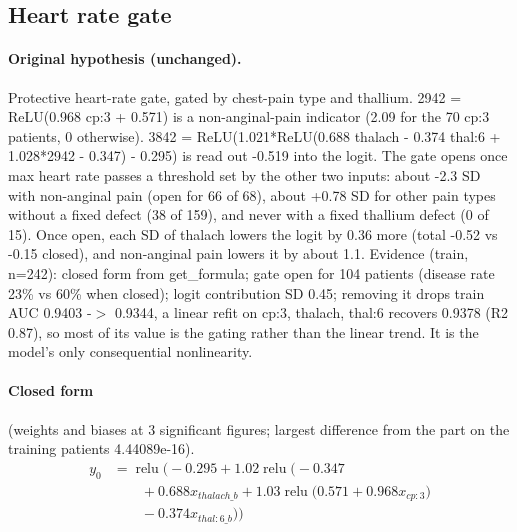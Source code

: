 \documentclass[a4paper,10pt]{article}
\newif\ifreviewmarks
\newcommand{\reviewrule}{\noindent{\color{BrickRed}\rule{\linewidth}{0.8pt}}}
\newenvironment{drafted}[1][]{%
  \ifreviewmarks\par\addvspace{\medskipamount}\reviewrule\par\nopagebreak
  \noindent{\color{BrickRed}\sffamily\footnotesize\textbf{Thesis Draft}\quad #1\hfill review}\par\nopagebreak\smallskip\fi}{%
  \ifreviewmarks\par\smallskip\noindent{\color{BrickRed}\sffamily\footnotesize end of thesis draft}\par\nopagebreak\reviewrule\par\medskip\fi}
\begin{document}
\begin{drafted}[plain-language layer: heart-s2-c2]
\subsection{Heart rate gate}\label{tech:ann28}
\paragraph{Original hypothesis (unchanged).} Protective heart-rate gate, gated by chest-pain type and thallium. 2942 = ReLU(0.968 cp:3 + 0.571) is a non-anginal-pain indicator (2.09 for the 70 cp:3 patients, 0 otherwise). 3842 = ReLU(1.021*\allowbreak{}ReLU(0.688 thalach - 0.374 thal:6 + 1.028*2942 - 0.347) - 0.295) is read out -0.519 into the logit. The gate opens once max heart rate passes a threshold set by the other two inputs: about -2.3 SD with non-anginal pain (open for 66 of 68), about +0.78 SD for other pain types without a fixed defect (38 of 159), and never with a fixed thallium defect (0 of 15). Once open, each SD of thalach lowers the logit by 0.36 more (total -0.52 vs -0.15 closed), and non-anginal pain lowers it by about 1.1. Evidence (train, n=242): closed form from get\_\allowbreak{}formula; gate open for 104 patients (disease rate 23\% vs 60\% when closed); logit contribution SD 0.45; removing it drops train AUC 0.9403 -$>$ 0.9344, a linear refit on cp:3, thalach, thal:6 recovers 0.9378 (R2 0.87), so most of its value is the gating rather than the linear trend. It is the model's only consequential nonlinearity.
\paragraph{Closed form} {\footnotesize(weights and biases at 3 significant figures; largest difference from the part on the training patients 4.44089e-16).}
{\small\begingroup\allowdisplaybreaks
\begin{align*}
y_{0} &= \operatorname{relu}\bigl(-0.295 + 1.02 \operatorname{relu}\bigl(-0.347 \\
&\qquad + 0.688 x_{thalach\_b} + 1.03 \operatorname{relu}\bigl(0.571 + 0.968 x_{cp:3}\bigr) \\
&\qquad - 0.374 x_{thal:6\_b}\bigr)\bigr)
\end{align*}\endgroup}


\end{drafted}
\end{document}
